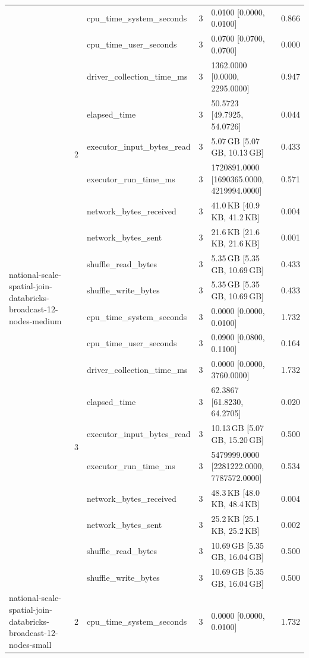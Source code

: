 \begin{tabular}{lllrll}
\cline{1-6} \cline{2-6}
\multirow[t]{20}{*}{national-scale-spatial-join-databricks-broadcast-12-nodes-medium} & \multirow[t]{10}{*}{2} & cpu_time_system_seconds & 3 & 0.0100 [0.0000, 0.0100] & 0.866 \\
 &  & cpu_time_user_seconds & 3 & 0.0700 [0.0700, 0.0700] & 0.000 \\
 &  & driver_collection_time_ms & 3 & 1362.0000 [0.0000, 2295.0000] & 0.947 \\
 &  & elapsed_time & 3 & 50.5723 [49.7925, 54.0726] & 0.044 \\
 &  & executor_input_bytes_read & 3 & 5.07\,GB [5.07\,GB, 10.13\,GB] & 0.433 \\
 &  & executor_run_time_ms & 3 & 1720891.0000 [1690365.0000, 4219994.0000] & 0.571 \\
 &  & network_bytes_received & 3 & 41.0\,KB [40.9\,KB, 41.2\,KB] & 0.004 \\
 &  & network_bytes_sent & 3 & 21.6\,KB [21.6\,KB, 21.6\,KB] & 0.001 \\
 &  & shuffle_read_bytes & 3 & 5.35\,GB [5.35\,GB, 10.69\,GB] & 0.433 \\
 &  & shuffle_write_bytes & 3 & 5.35\,GB [5.35\,GB, 10.69\,GB] & 0.433 \\
\cline{2-6}
 & \multirow[t]{10}{*}{3} & cpu_time_system_seconds & 3 & 0.0000 [0.0000, 0.0100] & 1.732 \\
 &  & cpu_time_user_seconds & 3 & 0.0900 [0.0800, 0.1100] & 0.164 \\
 &  & driver_collection_time_ms & 3 & 0.0000 [0.0000, 3760.0000] & 1.732 \\
 &  & elapsed_time & 3 & 62.3867 [61.8230, 64.2705] & 0.020 \\
 &  & executor_input_bytes_read & 3 & 10.13\,GB [5.07\,GB, 15.20\,GB] & 0.500 \\
 &  & executor_run_time_ms & 3 & 5479999.0000 [2281222.0000, 7787572.0000] & 0.534 \\
 &  & network_bytes_received & 3 & 48.3\,KB [48.0\,KB, 48.4\,KB] & 0.004 \\
 &  & network_bytes_sent & 3 & 25.2\,KB [25.1\,KB, 25.2\,KB] & 0.002 \\
 &  & shuffle_read_bytes & 3 & 10.69\,GB [5.35\,GB, 16.04\,GB] & 0.500 \\
 &  & shuffle_write_bytes & 3 & 10.69\,GB [5.35\,GB, 16.04\,GB] & 0.500 \\
\cline{1-6} \cline{2-6}
\multirow[t]{20}{*}{national-scale-spatial-join-databricks-broadcast-12-nodes-small} & \multirow[t]{10}{*}{2} & cpu_time_system_seconds & 3 & 0.0000 [0.0000, 0.0100] & 1.732 \\

\end{tabular}
